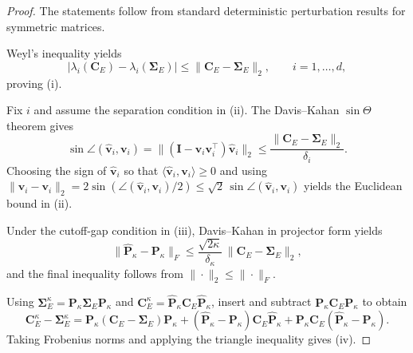 \documentclass[11pt,a4paper]{article}
\begin{document}
\begin{proof}
The statements follow from standard deterministic perturbation results for symmetric matrices.

\smallskip
\noindent Weyl's inequality yields
\begin{equation}
|\lambda_i(\mathbf{C}_E)-\lambda_i(\boldsymbol{\Sigma}_E)|
\le
\|\mathbf{C}_E-\boldsymbol{\Sigma}_E\|_2,
\qquad i=1,\ldots,d,
\end{equation}
proving (i).

\smallskip
\noindent Fix $i$ and assume the separation condition in (ii). The Davis--Kahan $\sin\Theta$ theorem gives
\begin{equation}
\sin\angle(\hat{\mathbf{v}}_i,\mathbf{v}_i)
=
\|(\mathbf{I}-\mathbf{v}_i\mathbf{v}_i^\top)\hat{\mathbf{v}}_i\|_2
\le
\frac{\|\mathbf{C}_E-\boldsymbol{\Sigma}_E\|_2}{\delta_i}.
\end{equation}
Choosing the sign of $\hat{\mathbf{v}}_i$ so that $\langle \hat{\mathbf{v}}_i,\mathbf{v}_i\rangle\ge 0$ and using
$\|\hat{\mathbf{v}}_i-\mathbf{v}_i\|_2=2\sin(\angle(\hat{\mathbf{v}}_i,\mathbf{v}_i)/2)\le \sqrt{2}\,\sin\angle(\hat{\mathbf{v}}_i,\mathbf{v}_i)$ yields the Euclidean bound in (ii).

\smallskip
\noindent Under the cutoff-gap condition in (iii), Davis--Kahan in projector form yields
\begin{equation}
\|\hat{\mathbf{P}}_\kappa-\mathbf{P}_\kappa\|_F
\le
\frac{\sqrt{2\kappa}}{\delta_\kappa}\,
\|\mathbf{C}_E-\boldsymbol{\Sigma}_E\|_2,
\end{equation}
and the final inequality follows from $\|\cdot\|_2\le \|\cdot\|_F$.

\smallskip
\noindent Using $\boldsymbol{\Sigma}_E^\kappa=\mathbf{P}_\kappa\boldsymbol{\Sigma}_E\mathbf{P}_\kappa$ and
$\mathbf{C}_E^\kappa=\hat{\mathbf{P}}_\kappa\mathbf{C}_E\hat{\mathbf{P}}_\kappa$, insert and subtract
$\mathbf{P}_\kappa\mathbf{C}_E\mathbf{P}_\kappa$ to obtain
\begin{equation}
\mathbf{C}_E^\kappa-\boldsymbol{\Sigma}_E^\kappa
=
\mathbf{P}_\kappa(\mathbf{C}_E-\boldsymbol{\Sigma}_E)\mathbf{P}_\kappa
+
(\hat{\mathbf{P}}_\kappa-\mathbf{P}_\kappa)\mathbf{C}_E\hat{\mathbf{P}}_\kappa
+
\mathbf{P}_\kappa\mathbf{C}_E(\hat{\mathbf{P}}_\kappa-\mathbf{P}_\kappa).
\end{equation}
Taking Frobenius norms and applying the triangle inequality gives (iv).
\end{proof}
\end{document}
